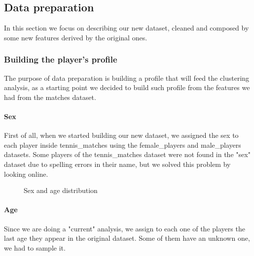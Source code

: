 \subsection{Data preparation}
In this section we focus on describing our new dataset, cleaned and composed by some new features derived by the original ones.

\subsubsection{Building the player's profile}
The purpose of data preparation is building a profile that will feed the clustering analysis, as a starting point we decided to build such profile from the features we had from the matches dataset.

\paragraph{Sex}
First of all, when we started building our new dataset, we assigned the sex to each player inside tennis\_matches using the female\_players and male\_players datasets. Some players of the tennis\_matches dataset were not found in the "sex" dataset due to spelling errors in their name, but we solved this problem by looking online.
\begin{figure}[H]
    \centering
    \caption{Sex and age distribution}
    \label{fig:sex_age_feature}
\end{figure}
\paragraph{Age}
Since we are doing a "current" analysis, we assign to each one of the players the last age they appear in the original dataset. Some of them have an unknown one, we had to sample it.

